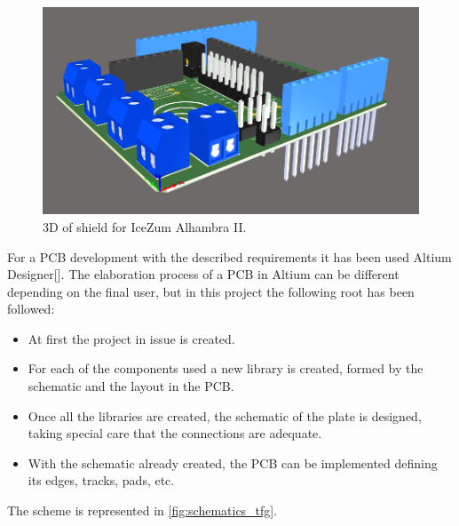 	\begin{center}
		\begin{figure}[H]
			\center
			\includegraphics[scale=0.6]{imagenes/Balancing_Robot/Vista3D2.PNG}
			\caption{3D of shield for IceZum Alhambra II.}
			\label{fig:Vista3D2}
		\end{figure}
	\end{center}


For a PCB development with the described requirements it has been used Altium Designer[]. The elaboration process of a PCB in Altium can be different depending on the final user, but in this project the following root has been followed:

\begin{itemize}
	\item At first the project in issue is created.
	\item For each of the components used a new library is created, formed by the schematic and the layout in the PCB.
	\item Once all the libraries are created, the schematic of the plate is designed, taking special care that the connections are adequate.
	\item With the schematic already created, the PCB can be implemented defining its edges, tracks, pads, etc.
\end{itemize}

The scheme is represented in \ref{fig:schematics_tfg}.
\newpage

